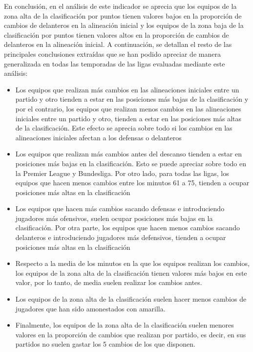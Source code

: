 En conclusión, en el análisis de este indicador se aprecia que los equipos de la zona alta de la 
clasificación por puntos tienen valores bajos en la proporción de cambios de delanteros en la 
alineación inicial y los equipos de la zona baja de la clasificación por puntos tienen valores altos 
en la proporción de cambios de delanteros en la alineación inicial.
A continuación, se detallan el resto de las principales conclusiones extraídas que se han podido 
apreciar de manera generalizada en todas las temporadas de las ligas evaluadas mediante este 
análisis:


\begin{itemize}
    \item Los equipos que realizan más cambios en las alineaciones iniciales entre un partido y otro
    tienden a estar en las posiciones más bajas de la clasificación y por el contrario, los 
    equipos que realizan menos cambios en las alineaciones iniciales entre un partido y otro, 
    tienden a estar en las posiciones más altas de la clasificación. Este efecto se aprecia sobre 
    todo si los cambios en las alineaciones iniciales afectan a los defensas o delanteros
    \item Los equipos que realizan más cambios antes del descanso tienden a estar en posiciones 
    más bajas en la clasificación. Esto se puede apreciar sobre todo en la Premier League y 
    Bundesliga. Por otro lado, para todas las ligas, los equipos que hacen menos cambios 
    entre los minutos 61 a 75, tienden a ocupar posiciones más altas en la clasificación
    \item Los equipos que hacen más cambios sacando defensas e introduciendo jugadores más
    ofensivos, suelen ocupar posiciones más bajas en la clasificación. Por otra parte, los 
    equipos que hacen menos cambios sacando delanteros e introduciendo jugadores más
    defensivos, tienden a ocupar posiciones más altas en la clasificación
    \item Respecto a la media de los minutos en la que los equipos realizan los cambios, los equipos 
    de la zona alta de la clasificación tienen valores más bajos en este valor, por lo tanto, de 
    media suelen realizar los cambios antes.
    \item Los equipos de la zona alta de la clasificación suelen hacer menos cambios de jugadores 
    que han sido amonestados con amarilla.
    \item Finalmente, los equipos de la zona alta de la clasificación suelen menores valores en la 
    proporción de cambios que realizan por partido, es decir, en sus partidos no suelen gastar
    los 5 cambios de los que disponen.
    
\end{itemize}


